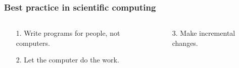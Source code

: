 \documentclass{beamer}
\begin{document}
\begin{frame}[t]
    \frametitle{Best practice in scientific computing}
    \begin{columns}
        \begin{column}{.23\linewidth}
            \begin{block}{}
                \begin{minipage}[t][\blockheight][t]{\linewidth}
                    \begin{enumerate}
                        \item[1.] Write programs for people, not computers.
                    \end{enumerate}
                \end{minipage}
            \end{block}
            \begin{block}{}
                \begin{minipage}[t][\blockheight][t]{\linewidth}
                    \begin{enumerate}
                        \item[2.] Let the computer do the work.
                    \end{enumerate}
                \end{minipage}
            \end{block}
        \end{column}
        \begin{column}{.23\linewidth}
            \begin{block}{}
                \begin{minipage}[t][\blockheight][t]{\linewidth}
                    \begin{enumerate}
                        \item[3.] Make incremental changes.
                    \end{enumerate}
                \end{minipage}
            \end{block}

\end{column}
\end{columns}
\end{frame}
\end{document}
